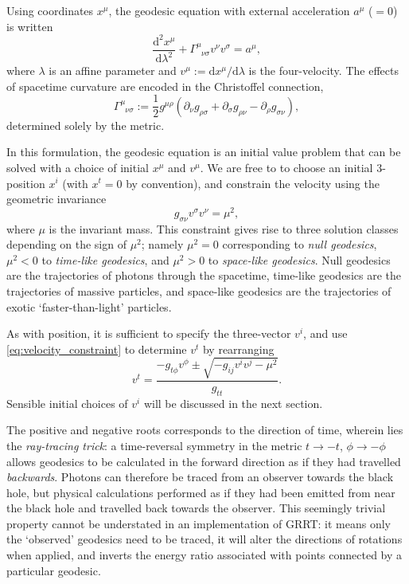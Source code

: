 \documentclass[fleqn,usenatbib]{mnras}
\renewcommand{\d}{\text{d}}
\newcommand{\utensor}[3]{#1^{#2}_{\phantom{#2}#3}}
\newcommand{\vel}[1]{v^{#1}}
\begin{document}
Using coordinates $x^\mu$, the geodesic equation with external acceleration
$a^\mu$ ($=0$) is written
\begin{equation}
\label{eq:geodesic_equation}
    \frac{\d^2 x^\mu}{\d \lambda^2}
    + \utensor{\Gamma}{\mu}{\nu\sigma}
    \vel{\nu}
    \vel{\sigma}
    = a^\mu,
\end{equation}
where $\lambda$ is an affine parameter and $v^\mu := \d x^\mu / \d \lambda$ is
the four-velocity. The effects of spacetime curvature are encoded in the
Christoffel connection,
\begin{equation}
\label{eq:christoffel}
    \utensor{\Gamma}{\mu}{\nu\sigma}
    := \frac{1}{2} g^{\mu\rho}
    \left(
        \partial_{\nu}g_{\rho \sigma}
        + \partial_{\sigma}g_{\rho \nu}
        - \partial_{\rho}g_{\sigma \nu}
    \right),
\end{equation}
determined solely by the metric.

In this formulation, the geodesic equation is an initial value
problem that can be
solved with a choice of initial $x^\mu$ and $\vel{\mu}$. We are free to to
choose an initial 3-position $x^i$ (with $x^t = 0$ by convention), and constrain
the velocity using the geometric invariance
\begin{equation}
\label{eq:velocity_constraint}
    g_{\sigma\nu} \vel{\sigma} \vel{\nu} = \mu^2,
\end{equation}
where $\mu$ is the invariant mass. This constraint gives rise to three solution
classes depending on the sign of $\mu^2$; namely $\mu^2 = 0$ corresponding to
\emph{null geodesics}, $\mu^2 < 0$ to \emph{time-like geodesics}, and $\mu^2 >
0$ to \emph{space-like geodesics}. Null geodesics are the trajectories of
photons through the spacetime, time-like geodesics are the trajectories of
massive particles, and space-like geodesics are the trajectories of exotic
`faster-than-light' particles.

As with position, it is sufficient to specify the three-vector $\vel{i}$,
and use \eqref{eq:velocity_constraint} to determine $\vel{t}$ by rearranging
\begin{equation}
\vel{t}  = \frac{-g_{t\phi} \vel{\phi} \pm
    \sqrt{-g_{ij} \vel{i} \vel{j} - \mu^2}
}{g_{tt}}.
\end{equation}
Sensible initial choices of $v^i$ will be discussed in the next section.

The positive and negative roots corresponds to the direction of time, wherein
lies the \textit{ray-tracing trick}: a time-reversal symmetry in the metric $t
\rightarrow -t$, $\phi \rightarrow -\phi$ allows geodesics to be calculated in
the forward direction as if they had travelled \textit{backwards}. Photons can
therefore be traced from an observer towards the black hole, but physical
calculations performed as if they had been emitted from near the black hole and
travelled back towards the observer. This seemingly trivial property cannot be
understated in an implementation of GRRT: it means only the `observed' geodesics
need to be traced, it will alter the directions of rotations when
applied, and inverts the energy ratio associated with points connected by
a particular geodesic.
\end{document}
